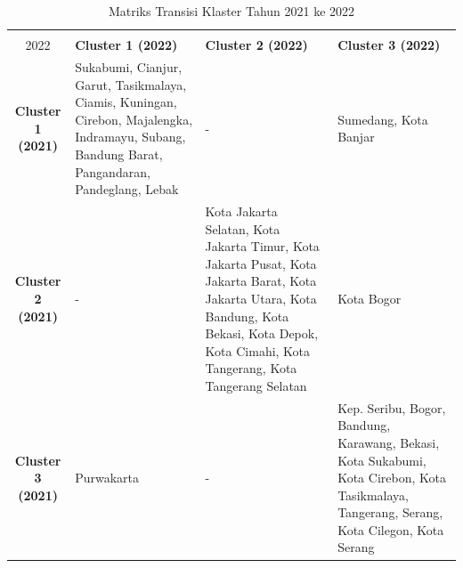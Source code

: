 \begin{table}[H]
\centering
\caption{Matriks Transisi Klaster Tahun 2021 ke 2022} \label{tab:transisi_2021_2022}
\begin{tabular}{|c|p{2cm}|p{2cm}|p{2cm}|}
\hline
\textbf{Tahun 2021 \\ 2022} & \textbf{Cluster 1 (2022)} & \textbf{Cluster 2 (2022)} & \textbf{Cluster 3 (2022)} \\ \hline
\textbf{Cluster 1 (2021)} & Sukabumi, Cianjur, Garut, Tasikmalaya, Ciamis, Kuningan, Cirebon, Majalengka, Indramayu, Subang, Bandung Barat, Pangandaran, Pandeglang, Lebak & - & Sumedang, Kota Banjar \\ \hline
\textbf{Cluster 2 (2021)} & - & Kota Jakarta Selatan, Kota Jakarta Timur, Kota Jakarta Pusat, Kota Jakarta Barat, Kota Jakarta Utara, Kota Bandung, Kota Bekasi, Kota Depok, Kota Cimahi, Kota Tangerang, Kota Tangerang Selatan & Kota Bogor \\ \hline
\textbf{Cluster 3 (2021)} & Purwakarta & - & Kep. Seribu, Bogor, Bandung, Karawang, Bekasi, Kota Sukabumi, Kota Cirebon, Kota Tasikmalaya, Tangerang, Serang, Kota Cilegon, Kota Serang \\ \hline
\end{tabular}
\end{table}